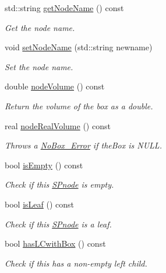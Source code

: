 \begin{DoxyCompactItemize}
std\-::string \hyperlink{classsubpavings_1_1SPnode_a930afc65b88ca963bb94d849a0e8c3db}{get\-Node\-Name} () const 
\begin{DoxyCompactList}\small\item\em \-Get the node name. \end{DoxyCompactList}\item 
void \hyperlink{classsubpavings_1_1SPnode_a628f03ae2795efd1135e6f4d06db987f}{set\-Node\-Name} (std\-::string newname)
\begin{DoxyCompactList}\small\item\em \-Set the node name. \end{DoxyCompactList}\item 
double \hyperlink{classsubpavings_1_1SPnode_ab8a45c1ea71b3c1e90f0fd9bd23562eb}{node\-Volume} () const 
\begin{DoxyCompactList}\small\item\em \-Return the volume of the box as a double. \end{DoxyCompactList}\item 
real \hyperlink{classsubpavings_1_1SPnode_ad219abf12ef0e39222748004e1ff1347}{node\-Real\-Volume} () const 
\begin{DoxyCompactList}\small\item\em \-Throws a \hyperlink{classsubpavings_1_1NoBox__Error}{\-No\-Box\-\_\-\-Error} if the\-Box is \-N\-U\-L\-L. \end{DoxyCompactList}\item 
bool \hyperlink{classsubpavings_1_1SPnode_a42410c54c2a5cc045ec63b26fb6ae593}{is\-Empty} () const 
\begin{DoxyCompactList}\small\item\em \-Check if this \hyperlink{classsubpavings_1_1SPnode}{\-S\-Pnode} is empty. \end{DoxyCompactList}\item 
bool \hyperlink{classsubpavings_1_1SPnode_af5ad3b1f3ca82ba135c491e99c53eda7}{is\-Leaf} () const 
\begin{DoxyCompactList}\small\item\em \-Check if this \hyperlink{classsubpavings_1_1SPnode}{\-S\-Pnode} is a leaf. \end{DoxyCompactList}\item 
bool \hyperlink{classsubpavings_1_1SPnode_a91a9483f923c30474b817c26ec8afbad}{has\-L\-Cwith\-Box} () const 
\begin{DoxyCompactList}\small\item\em \-Check if this has a non-\/empty left child. \end{DoxyCompactList}\item 

\end{DoxyCompactItemize}
